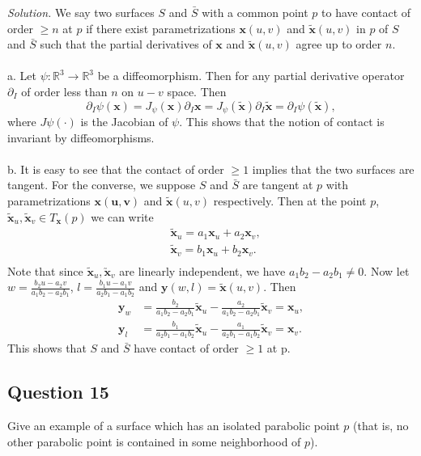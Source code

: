 \documentclass[12pt]{article}
\begin{document}
\textit{Solution.} We say two surfaces $S$ and $\bar{S}$ with a common point $p$ to have contact of order $\geq n$ at $p$ if there exist parametrizations $\mathbf{x}(u, v)$ and $\mathbf{\tilde{x}}(u,v)$ in $p$ of $S$ and $\bar{S}$ such that the partial derivatives of $\mathbf{x}$ and $\mathbf{\tilde{x}}(u,v)$ agree up to order $n$.\\\\
a. Let $\psi:\mathbb{R}^3 \to \mathbb{R}^3$ be a diffeomorphism. Then for any partial derivative operator $\partial _I$ of order less than $n$ on $u-v$ space. Then \begin{equation*}
    \partial _I\psi(\mathbf{x}) = J_\psi(\mathbf{x})\partial _I\mathbf{x} = J_\psi(\mathbf{\tilde{x}})\partial _I\mathbf{\tilde{x}} = \partial _I\psi(\mathbf{\tilde{x}}),
\end{equation*}
where $J\psi(\cdot)$ is the Jacobian of $\psi$. This shows that the notion of contact is invariant by diffeomorphisms.\\\\
b. It is easy to see that the contact of order $\geq 1$ implies that the two surfaces are tangent. For the converse, we suppose $S$ and $\bar{S}$ are tangent at $p$ with parametrizations $\mathbf{x(u,v)}$ and $\mathbf{\tilde{x}}(u,v)$ respectively. Then at the point $p$, $\mathbf{\tilde{x}}_u, \mathbf{\tilde{x}}_v \in T_{\mathbf{x}}(p)$ we can write \begin{align*}
    &\mathbf{\tilde{x}}_u = a_1 \mathbf{x}_u + a_2 \mathbf{x}_v,\\
    &\mathbf{\tilde{x}}_v = b_1 \mathbf{x}_u + b_2 \mathbf{x}_v.\\
\end{align*}
Note that since $\mathbf{\tilde{x}}_u, \mathbf{\utilde{x}}_v$ are linearly independent, we have $a_1b_2-a_2b_1\neq 0$. Now let $w = \frac{b_2u-a_2v}{a_1b_2-a_2b_1}$, $l = \frac{b_1u-a_1v}{a_2b_1-a_1b_2}$ and $\mathbf{{y}}(w,l) = \mathbf{\tilde{x}}(u,v)$. Then \begin{align*}
    \mathbf{y}_w &= \frac{b_2}{a_1b_2-a_2b_1}\mathbf{\tilde{x}}_u-\frac{a_2}{a_1b_2-a_2b_1}\mathbf{\tilde{x}}_v=\mathbf{x}_u,\\
    \mathbf{y}_l &=
    \frac{b_1}{a_2b_1-a_1b_2}\mathbf{\tilde{x}}_u-\frac{a_1}{a_2b_1-a_1b_2}\mathbf{\tilde{x}}_v=\mathbf{x}_v.
\end{align*}
This shows that $S$ and $\bar{S}$ have contact of order $\geq 1$ at p. 

\subsection*{Question 15}
Give an example of a surface which has an isolated parabolic point $p$ (that is, no other parabolic point is contained in some neighborhood of $p$).
\end{document}
